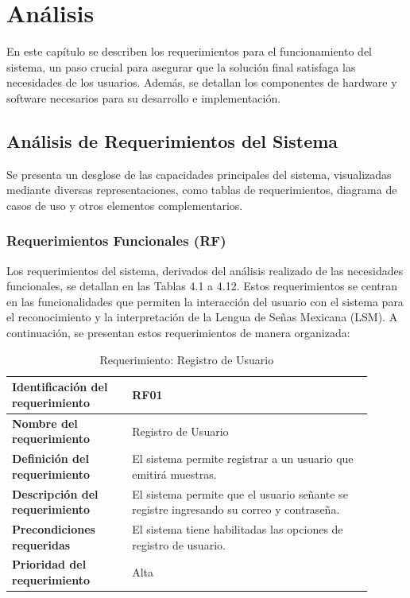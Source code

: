 \chapter{Análisis}
En este capítulo se describen los requerimientos para el funcionamiento del sistema, un paso crucial para asegurar que la solución final satisfaga las necesidades de los usuarios. Además, se detallan los componentes de hardware y software necesarios para su desarrollo e implementación.

\section{Análisis de Requerimientos del Sistema}
Se presenta un desglose de las capacidades principales del sistema, visualizadas mediante diversas representaciones, como tablas de requerimientos, diagrama de casos de uso y otros elementos complementarios.

\subsection{Requerimientos Funcionales (RF)} \label{sec:requerimientos_funcionales}


Los requerimientos del sistema, derivados del análisis realizado de las necesidades funcionales, se detallan en las Tablas 4.1 a 4.12. Estos requerimientos se centran en las funcionalidades que permiten la interacción del usuario con el sistema para el reconocimiento y la interpretación de la Lengua de Señas Mexicana (LSM). A continuación, se presentan estos requerimientos de manera organizada:

\begin{table}[H]
    \centering
    \begin{tabular}{|p{0.3\linewidth}|p{0.6\linewidth}|}
        \hline
        \textbf{Identificación del requerimiento} & RF01 \\
        \hline
        \textbf{Nombre del requerimiento} & Registro de Usuario \\
        \hline
        \textbf{Definición del requerimiento} & El sistema permite registrar a un usuario que emitirá muestras. \\
        \hline
        \textbf{Descripción del requerimiento} & El sistema permite que el usuario señante se registre ingresando su correo y contraseña. \\
        \hline
        \textbf{Precondiciones requeridas} & El sistema tiene habilitadas las opciones de registro de usuario. \\
        \hline
        \textbf{Prioridad del requerimiento} & Alta \\
        \hline
    \end{tabular}
    \caption{Requerimiento: Registro de Usuario}
    \label{tab:rf-registro-usuario}
\end{table}

